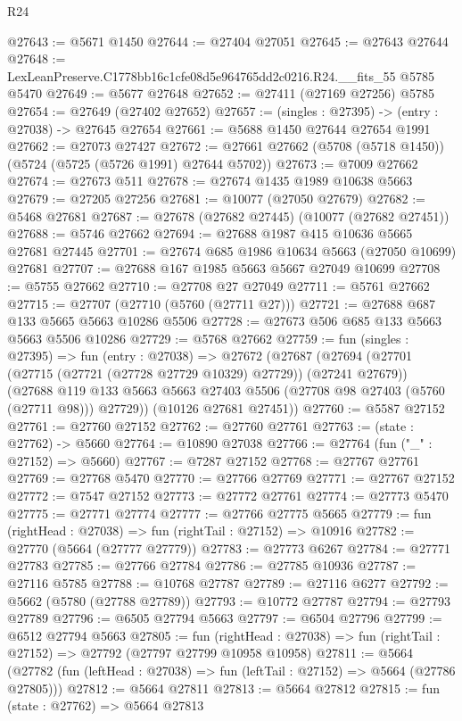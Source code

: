 \begin{lexlean}{R24}
\begin{coremodule}
@27643 := @5671 @1450
@27644 := @27404 @27051
@27645 := @27643 @27644
@27648 := LexLeanPreserve.C1778bb16c1cfe08d5e964765dd2c0216.R24.__fits_55 @5785 @5470
@27649 := @5677 @27648
@27652 := @27411 (@27169 @27256) @5785
@27654 := @27649 (@27402 @27652)
@27657 := (singles : @27395) -> (entry : @27038) -> @27645 @27654
@27661 := @5688 @1450 @27644 @27654 @1991
@27662 := @27073 @27427
@27672 := @27661 @27662 (@5708 (@5718 @1450)) (@5724 (@5725 (@5726 @1991) @27644 @5702))
@27673 := @7009 @27662
@27674 := @27673 @511
@27678 := @27674 @1435 @1989 @10638 @5663
@27679 := @27205 @27256
@27681 := @10077 (@27050 @27679)
@27682 := @5468 @27681
@27687 := @27678 (@27682 @27445) (@10077 (@27682 @27451))
@27688 := @5746 @27662
@27694 := @27688 @1987 @415 @10636 @5665 @27681 @27445
@27701 := @27674 @685 @1986 @10634 @5663 (@27050 @10699) @27681
@27707 := @27688 @167 @1985 @5663 @5667 @27049 @10699
@27708 := @5755 @27662
@27710 := @27708 @27 @27049
@27711 := @5761 @27662
@27715 := @27707 (@27710 (@5760 (@27711 @27)))
@27721 := @27688 @687 @133 @5665 @5663 @10286 @5506
@27728 := @27673 @506 @685 @133 @5663 @5663 @5506 @10286
@27729 := @5768 @27662
@27759 := fun (singles : @27395) =>
  fun (entry : @27038) =>
  @27672
    (@27687
      (@27694
        (@27701 (@27715 (@27721 (@27728 @27729 @10329) @27729)) (@27241 @27679))
        (@27688 @119 @133 @5663 @5663 @27403 @5506 (@27708 @98 @27403 (@5760 (@27711 @98))) @27729))
      (@10126 @27681 @27451))
@27760 := @5587 @27152
@27761 := @27760 @27152
@27762 := @27760 @27761
@27763 := (state : @27762) -> @5660
@27764 := @10890 @27038
@27766 := @27764 (fun ("_" : @27152) => @5660)
@27767 := @7287 @27152
@27768 := @27767 @27761
@27769 := @27768 @5470
@27770 := @27766 @27769
@27771 := @27767 @27152
@27772 := @7547 @27152
@27773 := @27772 @27761
@27774 := @27773 @5470
@27775 := @27771 @27774
@27777 := @27766 @27775 @5665
@27779 := fun (rightHead : @27038) => fun (rightTail : @27152) => @10916
@27782 := @27770 (@5664 (@27777 @27779))
@27783 := @27773 @6267
@27784 := @27771 @27783
@27785 := @27766 @27784
@27786 := @27785 @10936
@27787 := @27116 @5785
@27788 := @10768 @27787
@27789 := @27116 @6277
@27792 := @5662 (@5780 (@27788 @27789))
@27793 := @10772 @27787
@27794 := @27793 @27789
@27796 := @6505 @27794 @5663
@27797 := @6504 @27796
@27799 := @6512 @27794 @5663
@27805 := fun (rightHead : @27038) =>
  fun (rightTail : @27152) => @27792 (@27797 @27799 @10958 @10958)
@27811 := @5664
    (@27782 (fun (leftHead : @27038) => fun (leftTail : @27152) => @5664 (@27786 @27805)))
@27812 := @5664 @27811
@27813 := @5664 @27812
@27815 := fun (state : @27762) => @5664 @27813

\end{coremodule}
\end{lexlean}
